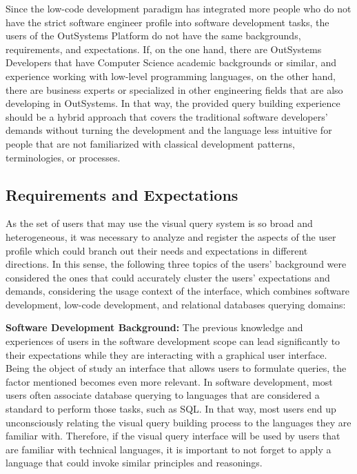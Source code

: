 Since the low-code development paradigm has integrated more people who do not have the strict software engineer profile into software development tasks, the users of the OutSystems Platform do not have the same backgrounds, requirements, and expectations. If, on the one hand, there are OutSystems Developers that have Computer Science academic backgrounds or similar, and experience working with low-level programming languages, on the other hand, there are business experts or specialized in other engineering fields that are also developing in OutSystems. In that way, the provided query building experience should be a hybrid approach that covers the traditional software developers' demands without turning the development and the language less intuitive for people that are not familiarized with classical development patterns, terminologies, or processes.

\subsection{Requirements and Expectations}
\label{subsec:requirements_and_expectations}

As the set of users that may use the visual query system is so broad and heterogeneous, it was necessary to analyze and register the aspects of the user profile which could branch out their needs and expectations in different directions. In this sense, the following three topics of the users' background were considered the ones that could accurately cluster the users' expectations and demands, considering the usage context of the interface, which combines software development, low-code development, and relational databases querying domains:

\medskip

\textbf{Software Development Background:} The previous knowledge and experiences of users in the software development scope can lead significantly to their expectations while they are interacting with a graphical user interface. Being the object of study an interface that allows users to formulate queries, the factor mentioned becomes even more relevant. In software development, most users often associate database querying to languages that are considered a standard to perform those tasks, such as SQL. In that way, most users end up unconsciously relating the visual query building process to the languages they are familiar with. Therefore, if the visual query interface will be used by users that are familiar with technical languages, it is important to not forget to apply a language that could invoke similar principles and reasonings.

